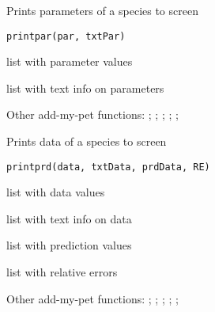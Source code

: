 \documentclass[a4paper]{book}
\begin{document}
%
\begin{Description}\relax
Prints parameters of a species to screen
\end{Description}
%
\begin{Usage}
\begin{verbatim}
printpar(par, txtPar)
\end{verbatim}
\end{Usage}
%
\begin{Arguments}
\begin{ldescription}
\item[\code{par}] list with parameter values

\item[\code{txtPar}] list with text info on parameters
\end{ldescription}
\end{Arguments}
%
\begin{SeeAlso}\relax
Other add-my-pet functions: ;
; ;
; ;
\end{SeeAlso}
%
\begin{Description}\relax
Prints data of a species to screen
\end{Description}
%
\begin{Usage}
\begin{verbatim}
printprd(data, txtData, prdData, RE)
\end{verbatim}
\end{Usage}
%
\begin{Arguments}
\begin{ldescription}
\item[\code{data}] list with data values

\item[\code{txtData}] list with text info on data

\item[\code{prdData}] list with prediction values

\item[\code{RE}] list with relative errors
\end{ldescription}
\end{Arguments}
%
\begin{SeeAlso}\relax
Other add-my-pet functions: ;
; ;
; ;
\end{SeeAlso}
\end{document}

